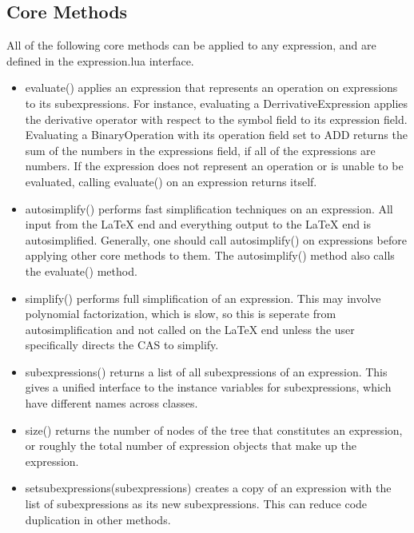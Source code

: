 \documentclass{article}
\begin{document}
\subsection{Core Methods}

All of the following core methods can be applied to any expression, and are defined in the {\ttfamily expression.lua} interface.

\begin{itemize}
    \item {\ttfamily evaluate()} applies an expression that represents an operation on expressions to its subexpressions. For instance, evaluating a {\ttfamily DerrivativeExpression} applies the derivative operator with respect to the {\ttfamily symbol} field to its {\ttfamily expression} field. Evaluating a {\ttfamily BinaryOperation} with its {\ttfamily operation} field set to {\ttfamily ADD} returns the sum of the numbers in the {\ttfamily expressions} field, if all of the expressions are numbers. If the expression does not represent an operation or is unable to be evaluated, calling {\ttfamily evaluate()} on an expression returns itself.
    
    \item {\ttfamily autosimplify()} performs fast simplification techniques on an expression. All input from the \LaTeX{} end and everything output to the \LaTeX{} end is autosimplified. Generally, one should call {\ttfamily autosimplify()} on expressions before applying other core methods to them. The {\ttfamily autosimplify()} method also calls the {\ttfamily evaluate()} method.
    
    \item {\ttfamily simplify()} performs full simplification of an expression. This may involve polynomial factorization, which is slow, so this is seperate from autosimplification and not called on the \LaTeX{} end unless the user specifically directs the CAS to simplify.
    
    \item {\ttfamily subexpressions()} returns a list of all subexpressions of an expression. This gives a unified interface to the instance variables for subexpressions, which have different names across classes.
    
    \item {\ttfamily size()} returns the number of nodes of the tree that constitutes an expression, or roughly the total number of expression objects that make up the expression.
    
    \item {\ttfamily setsubexpressions(subexpressions)} creates a copy of an expression with the list of subexpressions as its new subexpressions. This can reduce code duplication in other methods.
    

\end{itemize}
\end{document}
